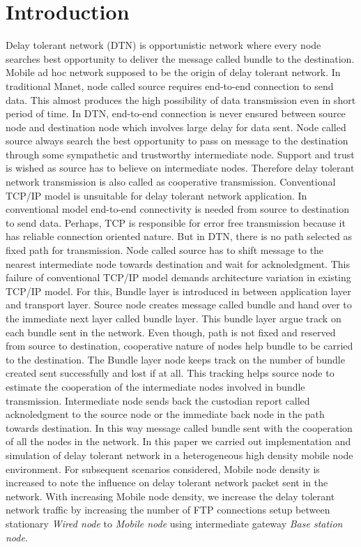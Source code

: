 \documentclass[3p,times]{elsarticle}
\begin{document}
\section{Introduction}\label{intro}
Delay tolerant network (DTN) is opportunistic network where every node searches best opportunity to deliver the message called bundle to the destination. Mobile ad hoc network supposed to be the origin of delay tolerant network. In traditional Manet, node called source requires end-to-end connection to send data. This almost produces the high possibility of data transmission even in short period of time. In DTN, end-to-end connection is never ensured between source node and destination node which involves large delay for data sent. Node called source always search the best opportunity to pass on message to the destination through some sympathetic and trustworthy intermediate node. Support and trust is wished as source has to believe on intermediate nodes. Therefore delay tolerant network transmission is also called as cooperative transmission.
Conventional TCP/IP model is unsuitable for delay tolerant network application. In conventional model end-to-end connectivity is needed from source to destination to send data. Perhaps, TCP is responsible for error free transmission because it has reliable connection oriented nature. But in DTN, there is no path selected as fixed path for transmission. Node called source has to shift message to the nearest intermediate node towards destination and wait for acknoledgment. 
This failure of conventional TCP/IP model demands architecture variation in existing TCP/IP model. For this, Bundle layer is introduced in between application layer and transport layer. Source node creates message called bundle and hand over to the immediate next layer called bundle layer. This bundle layer argue track on each bundle sent in the network. Even though, path is not fixed and reserved from source to destination, cooperative nature of nodes help bundle to be carried to the destination. The Bundle layer node keeps track on the number of bundle created sent successfully and lost if at all. This tracking helps source node to estimate the cooperation of the intermediate nodes involved in bundle transmission. Intermediate node sends back the custodian report called acknoledgment to the source node or the immediate back node in the path towards destination. In this way message called bundle sent with the cooperation of all the nodes in the network. In this paper we carried out implementation and simulation of delay tolerant network in a heterogeneous high density mobile node environment. For subsequent scenarios considered, Mobile node density is increased to note the influence on delay tolerant network packet sent in the network. With increasing Mobile node density, we increase the delay tolerant network traffic by increasing the number of FTP connections setup between stationary \emph{Wired node} to \emph{Mobile node} using intermediate gateway \emph{Base station node}. 
\end{document}
